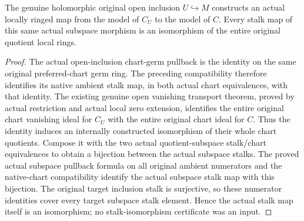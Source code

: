 \begin{theorem}
\label{hir:actual-analytic-subspace-open-stalk-iso}
\leanok
The genuine holomorphic original open inclusion $U\hookrightarrow M$
constructs an actual locally ringed map from the model of $C_U$ to the
model of $C$. Every stalk map of this same actual subspace morphism is
an isomorphism of the entire original quotient local rings.
\end{theorem}
\begin{proof}
The actual open-inclusion chart-germ pullback is the identity on the
same original preferred-chart germ ring. The preceding compatibility
therefore identifies its native ambient stalk map, in both actual chart
equivalences, with that identity. The existing genuine open vanishing
transport theorem, proved by actual restriction and actual local zero
extension, identifies the entire original chart vanishing ideal for
$C_U$ with the entire original chart ideal for $C$. Thus the identity
induces an internally constructed isomorphism of their whole chart
quotients. Compose it with the two actual quotient-subspace stalk/chart
equivalences to obtain a bijection between the actual subspace stalks.
The proved actual subspace pullback formula on all original ambient
numerators and the native-chart compatibility identify the actual
subspace stalk map with this bijection. The original target inclusion
stalk is surjective, so these numerator identities cover every target
subspace stalk element. Hence the actual stalk map itself is an
isomorphism; no stalk-isomorphism certificate was an input.
\end{proof}

